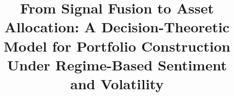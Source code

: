 \documentclass{singlecol-new}
\theoremstyle{TH}{
\newtheorem{lemma}{Lemma}
\newtheorem{theorem}[lemma]{Theorem}
\newtheorem{corrolary}[lemma]{Corrolary}
\newtheorem{conjecture}[lemma]{Conjecture}
\newtheorem{proposition}[lemma]{Proposition}
\newtheorem{claim}[lemma]{Claim}
\newtheorem{stheorem}[lemma]{Wrong Theorem}
\newtheorem{algorithm}{Algorithm}
}
\theoremstyle{THrm}{
\newtheorem{definition}{Definition}[section]
\newtheorem{question}{Question}[section]
\newtheorem{remark}{Remark}
\newtheorem{scheme}{Scheme}
}
\theoremstyle{THhit}{
\newtheorem{case}{Case}[section]
}
\begin{document}
%

\setcounter{page}{1}






\BottomCatch


\subtitle{}

\title{From Signal Fusion to Asset Allocation: A Decision-Theoretic Model for Portfolio Construction Under Regime-Based Sentiment and Volatility}

%
%
%
%
%
%

%
%
%
%
%
%
%
\end{document}
